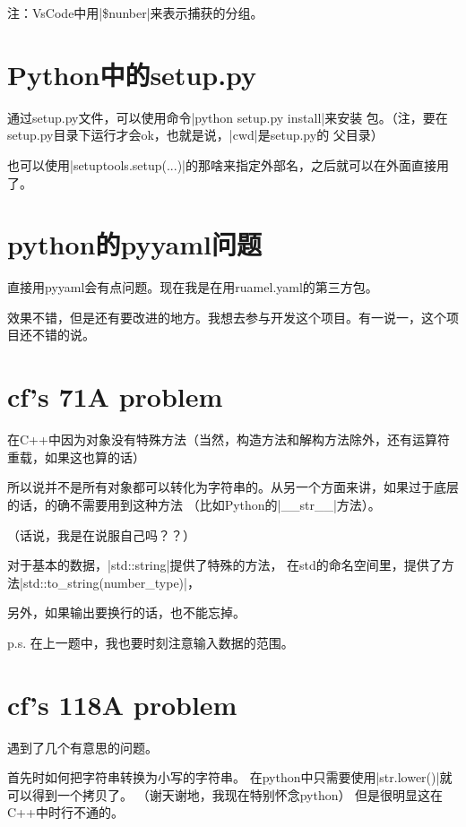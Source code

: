 注：VsCode中用\vb|\$nunber|来表示捕获的分组。



\section{Python中的setup.py}

通过setup.py文件，可以使用命令\vb|python setup.py install|来安装
包。（注，要在setup.py目录下运行才会ok，也就是说，\vb|cwd|是setup.py的
父目录）

也可以使用\vb|setuptools.setup(...)|的那啥来指定外部名，之后就可以在外面直接用了。


\section{python的pyyaml问题}

直接用pyyaml会有点问题。现在我是在用ruamel.yaml的第三方包。

效果不错，但是还有要改进的地方。我想去参与开发这个项目。有一说一，这个项目还不错的说。



\section{cf's 71A problem}

在C++中因为对象没有特殊方法（当然，构造方法和解构方法除外，还有运算符重载，如果这也算的话）

所以说并不是所有对象都可以转化为字符串的。从另一个方面来讲，如果过于底层的话，的确不需要用到这种方法
（比如Python的\vb|\_\_str\_\_|方法）。

（话说，我是在说服自己吗？？）

对于基本的数据，\vb|std::string|提供了特殊的方法，
在std的命名空间里，提供了方法\vb|std::to\_string(number\_type)|，

另外，如果输出要换行的话，也不能忘掉。

p.s. 在上一题中，我也要时刻注意输入数据的范围。


\section{cf's 118A problem}

 遇到了几个有意思的问题。

 首先时如何把字符串转换为小写的字符串。
 在python中只需要使用\vb|str.lower()|就可以得到一个拷贝了。
 （谢天谢地，我现在特别怀念python）
 但是很明显这在C++中时行不通的。

